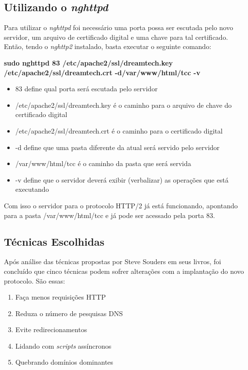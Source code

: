 \subsection{Utilizando o \textit{nghttpd}}
\label{utilizandoonghttpd}

Para utilizar o \textit{nghttpd} foi necessário uma porta possa ser escutada pelo novo servidor, um arquivo de certificado digital e uma chave para tal certificado. Então, tendo o \textit{nghttp2} instalado, basta executar o seguinte comando:

\textbf{sudo nghttpd 83 /etc/apache2/ssl/dreamtech.key /etc/apache2/ssl/dreamtech.crt -d/var/www/html/tcc -v}

\begin{itemize}
	\item 83 define qual porta será escutada pelo servidor
	\item /etc/apache2/ssl/dreamtech.key é o caminho para o arquivo de chave do certificado digital
	\item /etc/apache2/ssl/dreamtech.crt é o caminho para o certificado digital
	\item -d define que uma pasta diferente da atual será servido pelo servidor
	\item /var/www/html/tcc é o caminho da pasta que será servida
	\item -v define que o servidor deverá exibir (verbalizar) as operações que está executando
\end{itemize}

Com isso o servidor para o protocolo HTTP/2 já está funcionando, apontando para a pasta /var/www/html/tcc e já pode ser acessado pela porta 83.

\subsection{Técnicas Escolhidas}
\label{tecnicasescolhidas}

Após análise das técnicas propostas por Steve Souders em seus livros, foi concluído que cinco técnicas podem sofrer alterações com a implantação do novo protocolo. São essas:

\begin{enumerate}
	\item Faça menos requisições HTTP
	\item Reduza o número de pesquisas DNS
	\item Evite redirecionamentos
	\item Lidando com \textit{scripts} assíncronos
	\item Quebrando domínios dominantes
\end{enumerate}

